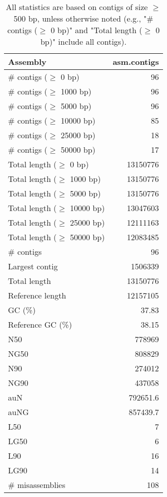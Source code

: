 \documentclass[12pt,a4paper]{article}
\begin{document}
\begin{table}[ht]
\begin{center}
\caption{All statistics are based on contigs of size $\geq$ 500 bp, unless otherwise noted (e.g., "\# contigs ($\geq$ 0 bp)" and "Total length ($\geq$ 0 bp)" include all contigs).}
\begin{tabular}{|l*{1}{|r}|}
\hline
Assembly & asm.contigs \\ \hline
\# contigs ($\geq$ 0 bp) & 96 \\ \hline
\# contigs ($\geq$ 1000 bp) & 96 \\ \hline
\# contigs ($\geq$ 5000 bp) & 96 \\ \hline
\# contigs ($\geq$ 10000 bp) & 85 \\ \hline
\# contigs ($\geq$ 25000 bp) & 18 \\ \hline
\# contigs ($\geq$ 50000 bp) & 17 \\ \hline
Total length ($\geq$ 0 bp) & 13150776 \\ \hline
Total length ($\geq$ 1000 bp) & 13150776 \\ \hline
Total length ($\geq$ 5000 bp) & 13150776 \\ \hline
Total length ($\geq$ 10000 bp) & 13047603 \\ \hline
Total length ($\geq$ 25000 bp) & 12111163 \\ \hline
Total length ($\geq$ 50000 bp) & 12083485 \\ \hline
\# contigs & 96 \\ \hline
Largest contig & 1506339 \\ \hline
Total length & 13150776 \\ \hline
Reference length & 12157105 \\ \hline
GC (\%) & 37.83 \\ \hline
Reference GC (\%) & 38.15 \\ \hline
N50 & 778969 \\ \hline
NG50 & 808829 \\ \hline
N90 & 274012 \\ \hline
NG90 & 437058 \\ \hline
auN & 792651.6 \\ \hline
auNG & 857439.7 \\ \hline
L50 & 7 \\ \hline
LG50 & 6 \\ \hline
L90 & 16 \\ \hline
LG90 & 14 \\ \hline
\# misassemblies & 108 \\ \hline

\end{tabular}
\end{center}
\end{table}
\end{document}
